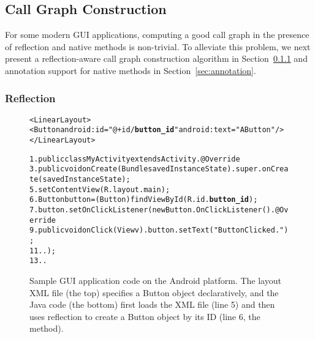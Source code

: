 \tinystep

\subsection{Call Graph Construction}
\label{sec:cgcon}

For some modern GUI applications, computing a good
call graph in the presence of reflection and native methods is non-trivial. 
To alleviate this problem, we next present a reflection-aware call graph
construction algorithm in Section~\ref{sec:cg} and annotation support
for native methods in Section~\ref{sec:annotation}.

\subsubsection{Reflection}
\label{sec:cg}

% 

\begin{figure}[t]
\begin{CodeOut}
\begin{alltt}
<LinearLayout>
    <Button android:id="@+id/\textbf{button\_id}" android:text="A Button" />
</LinearLayout>

1. public class MyActivity extends Activity .    @Override
3.    public void onCreate(Bundle savedInstanceState) .        super.onCreate(savedInstanceState);
5.        setContentView(R.layout.main);
6.        Button button = (Button) findViewById(R.id.\textbf{button\_id});
7.        button.setOnClickListener(new Button.OnClickListener() .            @Override
9.            public void onClick(View v) .               button.setText("Button Clicked.");
11.           .       \ttrcb);
13.   . \ttrcb
\end{alltt}
\end{CodeOut}
\vspace*{-3.0ex} \caption{Sample GUI application code on the Android platform. The layout
XML file (the top) specifies a Button object declaratively, 
and the Java code (the bottom)
first loads the XML file (line 5) and then uses reflection to create
a Button object by its ID (line 6, the  method).}
\label{fig:sampleandroid}
\end{figure}



